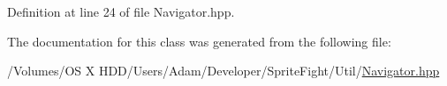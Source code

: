 Definition at line 24 of file Navigator.\-hpp.



The documentation for this class was generated from the following file\-:\begin{DoxyCompactItemize}
\item 
/\-Volumes/\-O\-S X H\-D\-D/\-Users/\-Adam/\-Developer/\-Sprite\-Fight/\-Util/\hyperlink{_navigator_8hpp}{Navigator.\-hpp}\end{DoxyCompactItemize}
